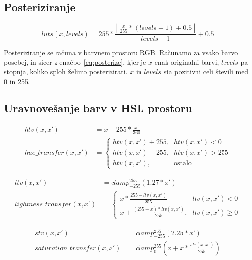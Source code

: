\subsection{Posteriziranje}
\label{sec:obdelavaSlikPosteriziranje}

\begin{equation}
luts(x, levels) = 255 * \frac{\left \lfloor{\frac{x}{255} * (levels - 1) + 0.5}\right \rfloor}{levels - 1} + 0.5 \label{eq:posterize}
\end{equation}

Posteriziranje se računa v barvnem prostoru RGB. Računamo za vsako barvo
posebej, in sicer z enačbo~\eqref{eq:posterize}, kjer je $x$ enak
originalni barvi, $levels$ pa stopnja, koliko sploh želimo posterizirati. $x$
in $levels$ sta pozitivni celi števili med 0 in 255.


\subsection{Uravnovešanje barv v HSL prostoru}
\label{sec:obdelavaSlikUravnovesanjeBarvHSL}

\begin{align}
htv(x, x') &= x + 255 * \frac{x'}{360} \nonumber \\
hue\_transfer(x, x') &=
\begin{cases}
    htv(x, x') + 255 \text{,}& htv(x, x') < 0 \\
    htv(x, x') - 255 \text{,}& htv(x, x') > 255 \\
    htv(x, x') \text{,}& \text{ostalo}
\end{cases} \label{eq:hue_transfer}
\end{align}

\begin{align}
ltv(x, x') &= clamp_{-255}^{255}(1.27 * x') \nonumber \\
lightness\_transfer(x, x') &=
\begin{cases}
    x * \frac{255 + ltv(x, x')}{255} \text{,}& ltv(x, x') < 0 \\
    x + \frac{(255 - x) * ltv(x, x')}{255} \text{,}& ltv(x, x') \geq 0
\end{cases} \label{eq:lightness_transfer}
\end{align}

\begin{align}
stv(x, x') &= clamp_{-255}^{255}(2.25 * x') \nonumber \\
saturation\_transfer(x, x') &= clamp_{0}^{255}(x + x * \frac{stv(x, x')}{255}) \label{eq:saturation_transfer}
\end{align}

